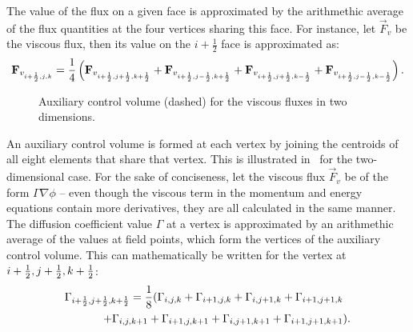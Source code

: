 The value of the flux on a given face is approximated by the arithmethic average of the flux quantities at the four vertices sharing this face. For instance, let $\vec{F}_v$ be the viscous flux, then its value on the $i+\frac{1}{2}$ face is approximated as:
\begin{equation*}
    \vec{F}_{v_{i+\half,j,k}} = \frac{1}{4} \left(
        \vec{F}_{v_{i+\half,j+\half,k+\half}} +
        \vec{F}_{v_{i+\half,j-\half,k+\half}} +
        \vec{F}_{v_{i+\half,j+\half,k-\half}} +
        \vec{F}_{v_{i+\half,j-\half,k-\half}}
    \right).
\end{equation*}
\begin{figure}
    \centering
    \begin{tikzpicture}[scale=3.0]
      
    \end{tikzpicture}
    \caption{Auxiliary control volume (dashed) for the viscous fluxes in two dimensions.}
    \label{fig:synaux}
\end{figure}

An auxiliary control volume is formed at each vertex by joining the centroids of all eight elements that share that vertex. This is illustrated in~ for the two-dimensional case. For the sake of conciseness, let the viscous flux $\vec{F}_v$ be of the form $\Gamma \nabla \phi$ -- even though the viscous term in the momentum and energy equations contain more derivatives, they are all calculated in the same manner. The diffusion coefficient value $\Gamma$ at a vertex is approximated by an arithmethic average of the values at field points, which form the vertices of the auxiliary control volume. This can mathematically be written for the vertex at $i+\half,j+\half,k+\half$:
\begin{align*}
    \Gamma_{i+\half,j+\half,k+\half} = \frac{1}{8} (
        \Gamma_{i,j,k} + \Gamma_{i+1,j,k} + \Gamma_{i,j+1,k} + \Gamma_{i+1,j+1,k}&
        \\
        + \Gamma_{i,j,k+1} + \Gamma_{i+1,j,k+1} + \Gamma_{i,j+1,k+1} + \Gamma_{i+1,j+1,k+1}&).
\end{align*}

